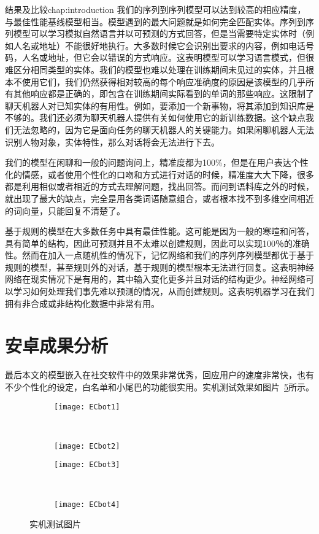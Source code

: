 \begin{cuzchapter}{结果及比较}{chap:introduction}
\newpage
我们的序列到序列模型可以达到较高的相应精度，与最佳性能基线模型相当。模型遇到的最大问题就是如何完全匹配实体。序列到序列模型可以学习模拟自然语言并以可预测的方式回答，但是当需要特定实体时（例如人名或地址）不能很好地执行。大多数时候它会识别出要求的内容，例如电话号码，人名或地址，但它会以错误的方式响应。这表明模型可以学习语言模式，但很难区分相同类型的实体。我们的模型也难以处理在训练期间未见过的实体，并且根本不使用它们，我们仍然获得相对较高的每个响应准确度的原因是该模型的几乎所有其他响应都是正确的，即包含在训练期间实际看到的单词的那些响应。这限制了聊天机器人对已知实体的有用性。例如，要添加一个新事物，将其添加到知识库是不够的。我们还必须为聊天机器人提供有关如何使用它的新训练数据。这个缺点我们无法忽略的，因为它是面向任务的聊天机器人的关键能力。如果闲聊机器人无法识别人物对象，实体特性，那么对话将会无法进行下去。

我们的模型在闲聊和一般的问题询问上，精准度都为100\%，但是在用户表达个性化的情感，或者使用个性化的口吻和方式进行对话的时候，精准度大大下降，很多都是利用相似或者相近的方式去理解问题，找出回答。而问到语料库之外的时候，就出现了最大的缺点，完全是用各类词语随意组合，或者根本找不到多维空间相近的词向量，只能回复不清楚了。

基于规则的模型在大多数任务中具有最佳性能。这可能是因为一般的寒暄和问答，具有简单的结构，因此可预测并且不太难以创建规则，因此可以实现100％的准确性。然而在加入一点随机性的情况下，记忆网络和我们的序列序列模型都优于基于规则的模型，甚至规则外的对话，基于规则的模型根本无法进行回复。这表明神经网络在现实情况下是有用的，其中输入变化更多并且对话的结构更少。神经网络可以学习如何处理我们事先难以预测的情况，从而创建规则。这表明机器学习在我们拥有非合成或非结构化数据中非常有用。
\newpage
\section{安卓成果分析}\label{sec:background}
最后本文的模型嵌入在社交软件中的效果非常优秀，回应用户的速度非常快，也有不少个性化的设定，白名单和小尾巴的功能很实用。实机测试效果如图片~\ref{fig:ECbot}所示。
\begin{figure}[!htbp]
    \centering
    \begin{subfigure}[b]{0.4\textwidth}
      \texttt{[image: ECbot1]}
      \caption{}
      \label{fig:ECbot1}
    \end{subfigure}%
    ~%
    \begin{subfigure}[b]{0.4\textwidth}
      \texttt{[image: ECbot2]}
      \caption{}
      \label{fig:ECbot2}
    \end{subfigure}
    \begin{subfigure}[b]{0.4\textwidth}
      \texttt{[image: ECbot3]}
      \caption{}
      \label{fig:ECbot3}
    \end{subfigure}%
    ~%
    \begin{subfigure}[b]{0.4\textwidth}
      \texttt{[image: ECbot4]}
      \caption{}
      \label{fig:ECbot4}
    \end{subfigure}
    \caption[总声压级]{实机测试图片}
    \label{fig:ECbot}
\end{figure}


\end{cuzchapter}
